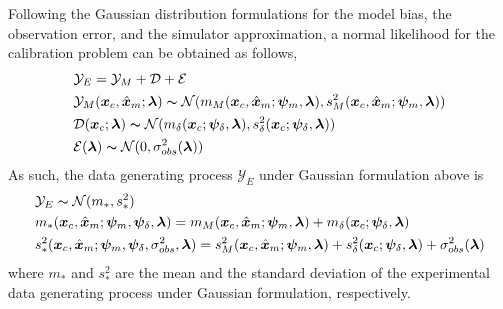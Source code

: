 Following the Gaussian distribution formulations for the model bias, the observation error, and the
simulator approximation, a normal likelihood for the calibration problem can be obtained as follows,
\begin{equation}
    \begin{split}
				& \mathcal{Y}_E = \mathcal{Y}_M + \mathcal{D} + \mathcal{E} \\
				& \mathcal{Y}_M (\bm{x}_c, \hat{\bm{x}}_m; \bm{\lambda}) \thicksim \mathcal{N}(m_M(\bm{x}_c, \hat{\bm{x}}_m; \bm{\psi}_{m}, \bm{\lambda}), s_M^2(\bm{x}_c, \hat{\bm{x}}_m; \bm{\psi}_{m}, \bm{\lambda})) \\
        & \mathcal{D}(\bm{x}_c; \bm{\lambda}) \thicksim \mathcal{N}(m_\delta(\bm{x}_c; \bm{\psi}_\delta, \bm{\lambda}), s_\delta^2(\bm{x}_c; \bm{\psi}_\delta, \bm{\lambda})) \\
        & \mathcal{E}(\boldsymbol{\lambda}) \thicksim \mathcal{N}(0, \sigma_{obs}^2(\bm{\lambda})) \\
    \end{split}
\label{eq:bc_data_generating_models_gaussian}
\end{equation}
As such, the data generating process $\mathcal{Y}_E$ under Gaussian formulation above is
\begin{equation}
	\begin{split}
		& \mathcal{Y}_E \thicksim \mathcal{N}(m_*, s^2_*) \\
		& m_*(\bm{x}_c, \hat{\bm{x}}_m; \bm{\psi}_m, \bm{\psi}_\delta, \bm{\lambda}) = m_M(\bm{x}_c, \hat{\bm{x}}_m; \bm{\psi}_m, \bm{\lambda}) + m_\delta(\bm{x}_c; \bm{\psi}_\delta, \bm{\lambda}) \\
		& s^2_*(\bm{x}_c, \hat{\bm{x}}_m; \bm{\psi}_m, \bm{\psi}_\delta, \sigma_{obs}^2, \bm{\lambda}) = s_M^2(\bm{x}_c, \hat{\bm{x}}_m; \bm{\psi}_{m}, \bm{\lambda}) + s_\delta^2(\bm{x}_c; \bm{\psi}_\delta, \bm{\lambda}) + \sigma_{obs}^2(\bm{\lambda})
	\end{split}
\label{eq:bc_data_model_gaussian}
\end{equation}
where $m_*$ and $s^2_*$ are the mean and the standard deviation of the experimental data generating process under Gaussian formulation, respectively.

